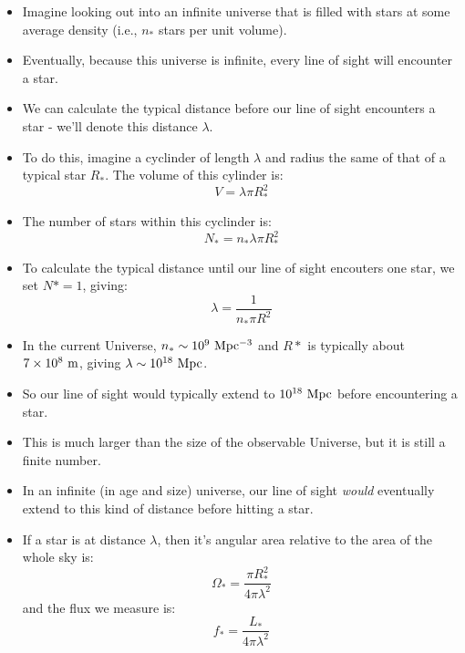 \documentclass[11pt]{article}
\begin{document}
\begin{itemize}
  \item Imagine looking out into an infinite universe that is filled with stars at some average density (i.e., $n_\ast$ stars per unit volume).
  \item Eventually, because this universe is infinite, every line of sight will encounter a star.
  \item We can calculate the typical distance before our line of sight encounters a star - we'll denote this distance $\lambda$.
  \item To do this, imagine a cyclinder of length $\lambda$ and radius the same of that of a typical star $R_\ast$. The volume of this cylinder is:
  \begin{equation}
    V = \lambda\pi R_\ast^2
  \end{equation}
  \item The number of stars within this cyclinder is:
  \begin{equation}
    N_\ast = n_\ast\lambda\pi R_\ast^2
  \end{equation}
  \item To calculate the typical distance until our line of sight encouters one star, we set $N\ast=1$, giving:
  \begin{equation}
  \lambda = \frac{1}{n_\ast\pi R^2}
  \end{equation}
  \item In the current Universe, $n_\ast\sim10^9~{\rm Mpc^{-3}}$ and $R\ast$ is typically about $7\times10^8~{\rm m}$, giving $\lambda\sim10^{18}~{\rm Mpc}$.
  \item So our line of sight would typically extend to $10^{18}~{\rm Mpc}$ before encountering a star.
  \item This is much larger than the size of the observable Universe, but it is still a finite number.
  \item In an infinite (in age and size) universe, our line of sight {\it would} eventually extend to this kind of distance before hitting a star.
  \item If a star is at distance $\lambda$, then it's angular area relative to the area of the whole sky is:
  \begin{equation}
    \Omega_\ast = \frac{\pi R_\ast^2}{4\pi \lambda^2}
  \end{equation}
  and the flux we measure is:
  \begin{equation}
    f_\ast = \frac{L_\ast}{4\pi \lambda^2}
  \end{equation}

\end{itemize}
\end{document}
